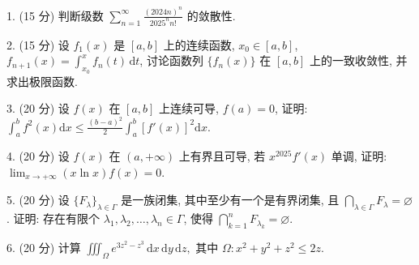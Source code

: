 \documentclass{examcollection}
\begin{document}
{\begin{minipage}{\textwidth}
1. (15 分) 判断级数 $\sum_{n=1}^{\infty} \frac{(2024n)^n}{2025^n n!}$ 的敛散性.\par
2. (15 分) 设 $f_{1}(x)$ 是 $[a, b]$ 上的连续函数, $x_{0} \in [a, b]$, $f_{n+1}(x) = \int_{x_{0}}^{x} f_{n}(t) \, \mathrm{d}t$, 讨论函数列 $\{f_{n}(x)\}$ 在 $[a, b]$ 上的一致收敛性, 并求出极限函数.\par
3. (20 分) 设 $f(x)$ 在 $[a, b]$ 上连续可导, $f(a) = 0$, 证明: $\int_{a}^{b} f^{2}(x) \mathrm{d}x \leq \frac{(b - a)^{2}}{2} \int_{a}^{b} [f'(x)]^{2} \mathrm{d}x$.\par
4. (20 分) 设 $f(x)$ 在 $(a, +\infty)$ 上有界且可导, 若 $x^{2025}f'(x)$ 单调, 证明: $\lim_{x \to +\infty} (x \ln x)f(x) = 0$.\par
5. (20 分) 设 $\{F_{\lambda}\}_{\lambda \in \Gamma}$ 是一族闭集, 其中至少有一个是有界闭集, 且 $\bigcap_{\lambda \in \Gamma} F_{\lambda} = \varnothing$. 证明: 存在有限个 $\lambda_1, \lambda_2, \dots, \lambda_n \in \Gamma$, 使得 $\bigcap_{k=1}^{n} F_{\lambda_k} = \varnothing$.\par
6. (20 分) 计算 $\iiint_{\Omega} e^{3z^2 - z^3} \, \mathrm{d}x \, \mathrm{d}y \, \mathrm{d}z,$ 其中 $\Omega: x^2 + y^2 + z^2 \leq 2z.$\par
\end{minipage}}
\ifdim\dimexpr\ht\proofbox+\dp\proofbox\relax>\textheight
\noindent\resizebox{!}{\textheight}{\usebox{\proofbox}}\else\noindent\usebox{\proofbox}\fi\clearpage
\end{document}
